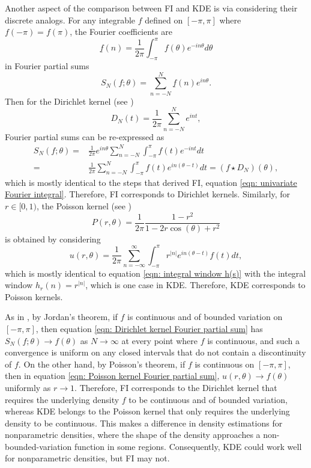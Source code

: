 \documentclass[%
 reprint,
 amsmath,amssymb,
 aps,
]{revtex4-2}
\begin{document}
Another aspect of the comparison between FI and KDE is via considering their discrete analogs. For any integrable $f$ defined on $[-\pi, \pi]$ where $f(-\pi) = f(\pi)$, the Fourier coefficients are
\begin{equation*}
    \underline{f}(n) = \frac{1}{2\pi}\int_{-\pi}^\pi f(\theta) e^{-in\theta}d\theta
\end{equation*}
in Fourier partial sums
\begin{equation*}
    S_N(f; \theta) = \sum_{n = -N}^N \underline{f}(n) e^{in\theta}.
\end{equation*}
Then for the Dirichlet kernel (see \cite{bhatia2005fourier})
\begin{equation*}
    D_N(t) = \frac{1}{2\pi} \sum_{n = -N}^N e^{int},
\end{equation*}
Fourier partial sums can be re-expressed as
\begin{align} \label{eqn: Dirichlet kernel Fourier partial sum}
    S_N(f; \theta) = & \frac{1}{2\pi} e^{in\theta} \sum_{n = -N}^N \int_{-\pi}^\pi f(t) e^{-int}dt\\
    = & \frac{1}{2\pi} \sum_{n = -N}^N \int_{-\pi}^\pi f(t) e^{in(\theta - t)}dt = (f \star D_N)(\theta),
\end{align}
which is mostly identical to the steps that derived FI, equation \eqref{eqn: univariate Fourier integral}. Therefore, FI corresponds to Dirichlet kernels. Similarly, for $r \in [0, 1)$, the Poisson kernel (see \cite{bhatia2005fourier})
\begin{equation*}
    P(r, \theta) = \frac{1}{2\pi} \frac{1-r^2}{1-2r\cos(\theta)+r^2}
\end{equation*}
is obtained by considering
\begin{equation} \label{eqn: Poisson kernel Fourier partial sum}
    u(r, \theta) = \frac{1}{2\pi} \sum_{n = -\infty}^\infty \int_{-\pi}^\pi r^{|n|} e^{in(\theta-t)} f(t)dt,
\end{equation}
which is mostly identical to equation \eqref{eqn: integral window h(s)} with the integral window $h_r(n) = r^{|n|}$, which is one case in KDE. Therefore, KDE corresponds to Poisson kernels.

As in \cite{bhatia2005fourier}, by Jordan's theorem, if $f$ is continuous and of bounded variation on $[-\pi, \pi]$, then equation \eqref{eqn: Dirichlet kernel Fourier partial sum} has $\displaystyle S_N(f; \theta) \to f(\theta)$ as $N \to \infty$ at every point where $f$ is continuous, and such a convergence is uniform on any closed intervals that do not contain a discontinuity of $f$. On the other hand, by Poisson's theorem, if $f$ is continuous on $[-\pi, \pi]$, then in equation \eqref{eqn: Poisson kernel Fourier partial sum}, $u(r, \theta) \to f(\theta)$ uniformly as $r \to 1$. Therefore, FI corresponds to the Dirichlet kernel that requires the underlying density $f$ to be continuous and of bounded variation, whereas KDE belongs to the Poisson kernel that only requires the underlying density to be continuous. This makes a difference in density estimations for nonparametric densities, where the shape of the density approaches a non-bounded-variation function in some regions. Consequently, KDE could work well for nonparametric densities, but FI may not.
\end{document}
